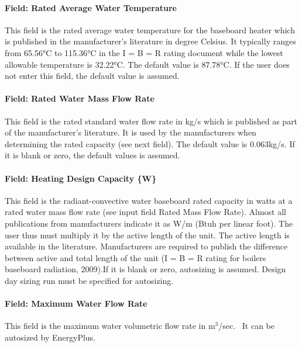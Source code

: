 \paragraph{Field: Rated Average Water Temperature}\label{field-rated-averagewatertemperature}

This field is the rated average water temperature for the baseboard heater which is published in the manufacturer's literature in degree Celsius. It typically ranges from 65.56°C to 115.36°C in the I = B = R rating document while the lowest allowable temperature is 32.22°C. The default value is 87.78°C. If the user does not enter this field, the default value is assumed.

\paragraph{Field: Rated Water Mass Flow Rate}

This field is the rated standard water flow rate in kg/s which is published as part of the manufacturer's literature. It is used by the manufacturers when determining the rated capacity (see next field). The default value is 0.063kg/s. If it is blank or zero, the default values is assumed.

\paragraph{Field: Heating Design Capacity \{W\}}\label{field-heating-design-capacity-w-000}

This field is the radiant-convective water baseboard rated capacity in watts at a rated water mass flow rate (see input field Rated Mass Flow Rate). Almost all publications from manufacturers indicate it as W/m (Btuh per linear foot). The user thus must multiply it by the active length of the unit. The active length is available in the literature. Manufacturers are required to publish the difference between active and total length of the unit (I = B = R rating for boilers baseboard radiation, 2009).If it is blank or zero, autosizing is assumed. Design day sizing run must be specified for autosizing.

\paragraph{Field: Maximum Water Flow Rate}\label{field-maximum-water-flow-rate-001}

This field is the maximum water volumetric flow rate in m\(^{3}\)/sec.~ It can be autosized by EnergyPlus.

